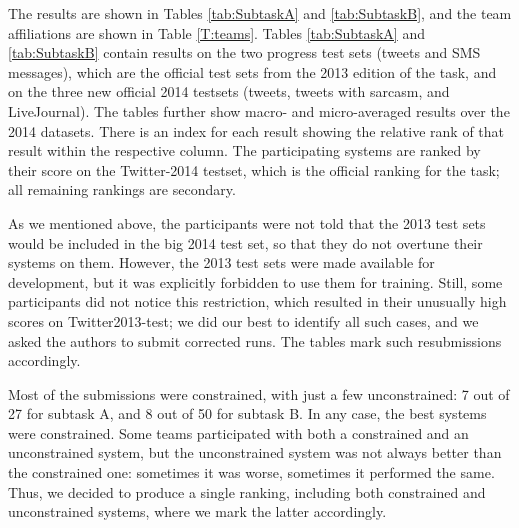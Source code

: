 \documentclass[11pt]{article}
\begin{document}

The results are shown in Tables \ref{tab:SubtaskA} and \ref{tab:SubtaskB},
and the team affiliations are shown in Table \ref{T:teams}.
Tables \ref{tab:SubtaskA} and \ref{tab:SubtaskB} contain results on the two progress test sets (tweets and SMS messages), which are the official test sets from the 2013 edition of the task, and on the three new official 2014 testsets (tweets, tweets with sarcasm, and LiveJournal). The tables further show macro- and micro-averaged results over the 2014 datasets. There is an index for each result showing the relative rank of that result within the respective column.
The participating systems are ranked by their score on the Twitter-2014 testset, which is the official ranking for the task;
all remaining rankings are secondary.


As we mentioned above, the participants were not told that the 2013 test sets would be included in the big 2014 test set,
so that they do not overtune their systems on them.
However, the 2013 test sets were made available for development,
but it was explicitly forbidden to use them for training.
Still, some participants did not notice this restriction, which resulted in their unusually high scores on Twitter2013-test;
we did our best to identify all such cases, and we asked the authors to submit corrected runs.
The tables mark such resubmissions accordingly.

Most of the submissions were constrained, with just a few unconstrained:
7 out of 27 for subtask A, and 8 out of 50 for subtask B.
In any case, the best systems were constrained.
Some teams participated with both a constrained and an unconstrained system,
but the unconstrained system was not always better than the constrained one:
sometimes it was worse, sometimes it performed the same.
Thus, we decided to produce a single ranking, including both constrained and unconstrained systems,
where we mark the latter accordingly.
\end{document}
